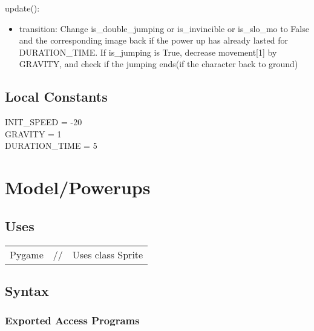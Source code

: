 \documentclass[12pt]{article}
\begin{document}
\noindent update():
\begin{itemize}
\item transition: Change is\_double\_jumping or is\_invincible or is\_slo\_mo to False and the corresponding image back if the power up has already lasted for DURATION\_TIME. If is\_jumping is True, decrease movement[1] by GRAVITY, and check if the jumping ends(if the character back to ground)
\end{itemize}
\subsection*{Local Constants}
INIT\_SPEED = -20\\
GRAVITY = 1\\
DURATION\_TIME = 5\\
\medskip
\newpage

\section*{Model/Powerups}

\subsection* {Uses}

\begin{tabular}{lll}
    Pygame & // & Uses class Sprite\\
\end{tabular}

\subsection* {Syntax}

\subsubsection* {Exported Access Programs}
\end{document}
